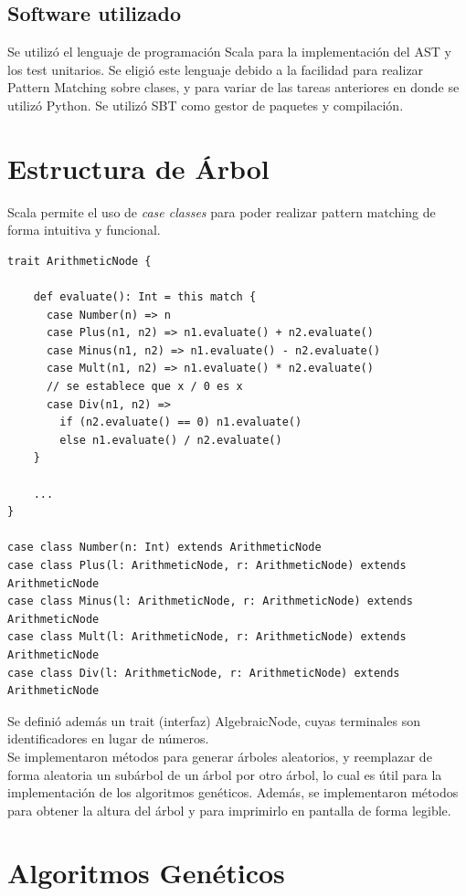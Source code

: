 \documentclass[11pt,letterpaper]{article}
\begin{document}
\subsection{Software utilizado}
Se utilizó el lenguaje de programación Scala para la implementación del AST y los test unitarios. Se 
eligió este lenguaje debido a la facilidad para realizar Pattern Matching sobre clases, y para variar 
de las tareas anteriores en donde se utilizó Python. Se utilizó SBT como gestor de paquetes y compilación.

\section{Estructura de Árbol}

Scala permite el uso de \textit{case classes} para poder realizar pattern matching de forma 
intuitiva y funcional.

\begin{lstlisting}
trait ArithmeticNode {

    def evaluate(): Int = this match {
      case Number(n) => n
      case Plus(n1, n2) => n1.evaluate() + n2.evaluate()
      case Minus(n1, n2) => n1.evaluate() - n2.evaluate()
      case Mult(n1, n2) => n1.evaluate() * n2.evaluate()
      // se establece que x / 0 es x
      case Div(n1, n2) =>
        if (n2.evaluate() == 0) n1.evaluate()
        else n1.evaluate() / n2.evaluate()
    }

    ...
}

case class Number(n: Int) extends ArithmeticNode
case class Plus(l: ArithmeticNode, r: ArithmeticNode) extends ArithmeticNode
case class Minus(l: ArithmeticNode, r: ArithmeticNode) extends ArithmeticNode
case class Mult(l: ArithmeticNode, r: ArithmeticNode) extends ArithmeticNode
case class Div(l: ArithmeticNode, r: ArithmeticNode) extends ArithmeticNode
\end{lstlisting}

Se definió además un trait (interfaz) AlgebraicNode, cuyas terminales son identificadores en lugar de 
números.\\

Se implementaron métodos para generar árboles aleatorios, y reemplazar de forma aleatoria un subárbol de 
un árbol por otro árbol, lo cual es útil para la implementación de los algoritmos genéticos. Además, se implementaron métodos para obtener la altura del árbol y para imprimirlo en pantalla de forma legible.

\section{Algoritmos Genéticos}
\end{document}

